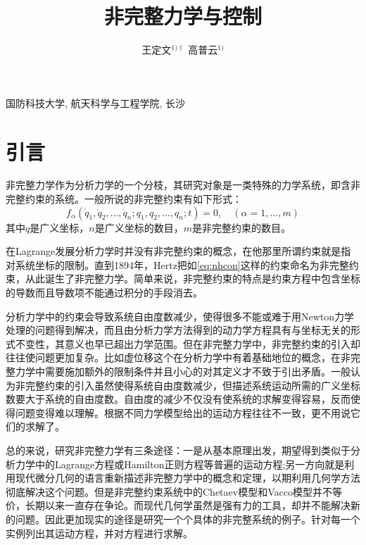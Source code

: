 \documentclass[A4,twoside]{ctexart}
\begin{document}
\apsname

\title{非完整力学与控制\fivestar}

\author{王定文$^{1)\dag}$ \quad 高普云$^{1)}$}
\address{1)}{国防科技大学, 航天科学与工程学院, 长沙 }






\section{引言}
\label{sec:intr}
非完整力学作为分析力学的一个分枝，其研究对象是一类特殊的力学系统，即含非完整约束的系统。一般所说的非完整约束有如下形式：
\begin{equation}
  \label{eq:nhcon}
  f_{\alpha}(\dot{q}_1,\dot{q}_2,\ldots,\dot{q}_n;q_1,q_2,\ldots,q_n;t)=0,\quad(\alpha=1,\ldots,m)
\end{equation}
其中$q$是广义坐标，$n$是广义坐标的数目，$m$是非完整约束的数目。

在Lagrange发展分析力学时并没有非完整约束的概念，在他那里所谓约束就是指对系统坐标的限制。直到1894年，Hertz把如\eqref{eq:nhcon}这样的约束命名为非完整约束，从此诞生了非完整力学\supercite{1}。简单来说，非完整约束的特点是约束方程中包含坐标的导数而且导数项不能通过积分的手段消去。

分析力学中的约束会导致系统自由度数减少，使得很多不能或难于用Newton力学处理的问题得到解决，而且由分析力学方法得到的动力学方程具有与坐标无关的形式不变性，其意义也早已超出力学范围。但在非完整力学中，非完整约束的引入却往往使问题更加复杂。比如虚位移这个在分析力学中有着基础地位的概念，在非完整力学中需要施加额外的限制条件并且小心的对其定义才不致于引出矛盾。一般认为非完整约束的引入虽然使得系统自由度数减少，但描述系统运动所需的广义坐标数要大于系统的自由度数。自由度的减少不仅没有使系统的求解变得容易，反而使得问题变得难以理解。根据不同力学模型给出的运动方程往往不一致，更不用说它们的求解了\supercite{2,3,4}。

总的来说，研究非完整力学有三条途径：一是从基本原理出发，期望得到类似于分析力学中的Lagrange方程或Hamilton正则方程等普遍的运动方程;另一方向就是利用现代微分几何的语言重新描述非完整力学中的概念和定理，以期利用几何学方法彻底解决这个问题。但是非完整约束系统中的Chetaev模型和Vacco模型并不等价，长期以来一直存在争论。而现代几何学虽然是强有力的工具，却并不能解决新的问题。因此更加现实的途径是研究一个个具体的非完整系统的例子。针对每一个实例列出其运动方程，并对方程进行求解\supercite{5}。
\end{document}
